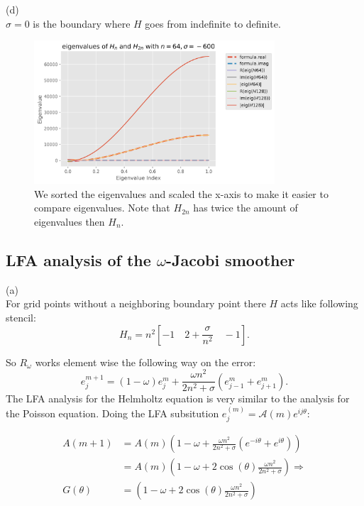 \documentclass[a4paper,12pt]{article}
\begin{document}
(d) \\
$\sigma = 0$ is the boundary where $H$ goes from indefinite to definite.
\begin{figure}[h!]
    \centering
    \includegraphics[width=0.8\textwidth]{../code/plts/eigenvalues_1Dreal.png}
    \caption{We sorted the eigenvalues and scaled the x-axis to make it easier to compare eigenvalues.
        Note that $H_{2n}$ has twice the amount of eigenvalues then $H_{n}$.}
    \label{fig:eigen 1D real}
\end{figure}


\subsection{LFA analysis of the $\omega$-Jacobi smoother}
(a) \\
For grid points without a neighboring boundary point there
$H$ acts like following stencil:
\[
    H_n = n^{2} [ -1 \quad 2+ \frac{\sigma}{n^{2}}  \quad -1]
    .\]

So $R_{\omega}$ works element wise the following way on the error:
\begin{equation}
    e_{j}^{m+1} = (1-\omega) e_{j} ^{m} + \frac{\omega n^{2}}{2 n^{2} + \sigma} (e_{j-1} ^{m} + e_{j+1}^{m})
    .
\end{equation}
The LFA analysis for the Helmholtz equation is very similar to the analysis for the Poisson equation.
Doing the LFA subsitution $e_j^{(m)}=\mathcal{A}(m) e^{i j \theta}$:

\begin{align}
    A(m+1)    & = A(m) \left( 1-\omega + \frac{\omega n^{2}}{2 n^{2} + \sigma} (e^{-i\theta} + e^{i\theta}) \right) \\
              & = A(m) \left( 1-\omega + 2 \cos(\theta) \frac{\omega n^{2}}{2 n^{2} + \sigma}   \right) \Rightarrow \\
    G(\theta) & = \left( 1-\omega + 2 \cos(\theta) \frac{\omega n^{2}}{2 n^{2} + \sigma}   \right)
\end{align}
\end{document}
